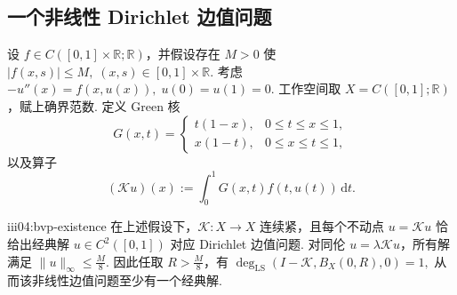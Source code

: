 \subsection{一个非线性 Dirichlet 边值问题}

设 \(\displaystyle f\in C([0,1]\times\mathbb R;\mathbb R)\)，并假设存在 \(\displaystyle M>0\) 使
\(\displaystyle |f(x,s)|\leqslant M, \; (x,s)\in[0,1]\times\mathbb R.\)
考虑
\(\displaystyle -u''(x)=f(x,u(x)), \; u(0)=u(1)=0.\)
工作空间取 \(\displaystyle X=C([0,1];\mathbb R)\)，赋上确界范数. 定义 Green 核
\[
G(x,t)
=
\begin{cases}
t(1-x),&0\leqslant t\leqslant x\leqslant1,\\
x(1-t),&0\leqslant x\leqslant t\leqslant1,
\end{cases}
\]
以及算子
\[
(\mathcal Ku)(x)
:=
\int_0^1G(x,t)f(t,u(t))\,\mathrm{d}t.
\]

\begin{FATheorem}{iii04:bvp-existence}
在上述假设下，\(\displaystyle\mathcal K:X\to X\) 连续紧，且每个不动点 \(\displaystyle u=\mathcal Ku\) 恰给出经典解 \(\displaystyle u\in C^2([0,1])\) 对应 Dirichlet 边值问题. 对同伦 \(\displaystyle u=\lambda\mathcal Ku\)，所有解满足
\(\displaystyle \|u\|_{\infty} \leqslant \frac{M}{8}.\)
因此任取 \(\displaystyle R>\frac{M}{8}\)，有
\(\displaystyle \deg_{\mathrm{LS}}(I-\mathcal K,B_X(0,R),0)=1,\)
从而该非线性边值问题至少有一个经典解.
\end{FATheorem}

